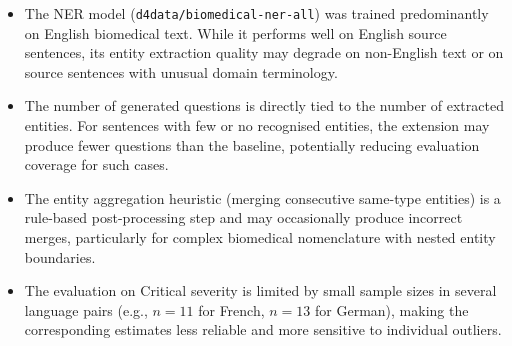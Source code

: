 \begin{itemize}
    \item The NER model (\texttt{d4data/biomedical-ner-all}) was trained predominantly on English biomedical text. While it performs well on English source sentences, its entity extraction quality may degrade on non-English text or on source sentences with unusual domain terminology.
    
    \item The number of generated questions is directly tied to the number of extracted entities. For sentences with few or no recognised entities, the extension may produce fewer questions than the baseline, potentially reducing evaluation coverage for such cases.
    
    \item The entity aggregation heuristic (merging consecutive same-type entities) is a rule-based post-processing step and may occasionally produce incorrect merges, particularly for complex biomedical nomenclature with nested entity boundaries.
    
    \item The evaluation on Critical severity is limited by small sample sizes in several language pairs (e.g., $n = 11$ for French, $n = 13$ for German), making the corresponding estimates less reliable and more sensitive to individual outliers.
\end{itemize}
